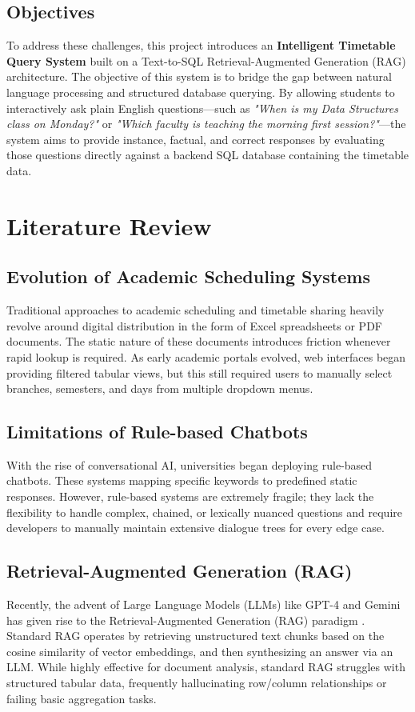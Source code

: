\documentclass[12pt]{article}
\begin{document}
\subsection{Objectives}
To address these challenges, this project introduces an \textbf{Intelligent Timetable Query System} built on a Text-to-SQL Retrieval-Augmented Generation (RAG) architecture. The objective of this system is to bridge the gap between natural language processing and structured database querying. By allowing students to interactively ask plain English questions—such as \textit{"When is my Data Structures class on Monday?"} or \textit{"Which faculty is teaching the morning first session?"}—the system aims to provide instance, factual, and correct responses by evaluating those questions directly against a backend SQL database containing the timetable data.

\newpage

\section{Literature Review}

\subsection{Evolution of Academic Scheduling Systems}
Traditional approaches to academic scheduling and timetable sharing heavily revolve around digital distribution in the form of Excel spreadsheets or PDF documents. The static nature of these documents introduces friction whenever rapid lookup is required. As early academic portals evolved, web interfaces began providing filtered tabular views, but this still required users to manually select branches, semesters, and days from multiple dropdown menus.

\subsection{Limitations of Rule-based Chatbots}
With the rise of conversational AI, universities began deploying rule-based chatbots. These systems mapping specific keywords to predefined static responses. However, rule-based systems are extremely fragile; they lack the flexibility to handle complex, chained, or lexically nuanced questions and require developers to manually maintain extensive dialogue trees for every edge case.

\subsection{Retrieval-Augmented Generation (RAG)}
Recently, the advent of Large Language Models (LLMs) like GPT-4 and Gemini has given rise to the Retrieval-Augmented Generation (RAG) paradigm \cite{rag_paper}. Standard RAG operates by retrieving unstructured text chunks based on the cosine similarity of vector embeddings, and then synthesizing an answer via an LLM. While highly effective for document analysis, standard RAG struggles with structured tabular data, frequently hallucinating row/column relationships or failing basic aggregation tasks.
\end{document}

